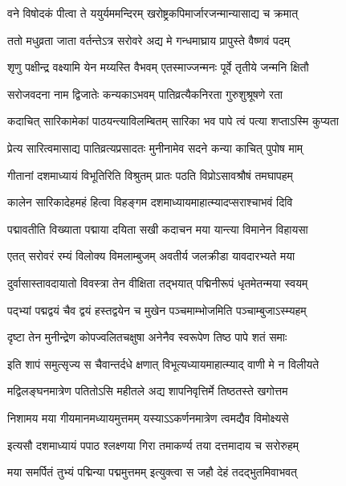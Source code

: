 \twolineshloka
{वने विषोदकं पीत्वा ते ययुर्यममन्दिरम्}
{खरोष्ट्रकपिमार्जारजन्मान्यासाद्य च क्रमात्} %

\twolineshloka
{ततो मधुव्रता जाता वर्तन्तेऽत्र सरोवरे}
{अद्य मे गन्धमाघ्राय प्रापुस्ते वैष्णवं पदम्} %

\twolineshloka
{शृणु पक्षीन्द्र वक्ष्यामि येन मय्यस्ति वैभवम्}
{एतस्माज्जन्मनः पूर्वे तृतीये जन्मनि क्षितौ} %

\twolineshloka
{सरोजवदना नाम द्विजातेः कन्यकाऽभवम्}
{पातिव्रत्यैकनिरता गुरुशुश्रूषणे रता} %

\twolineshloka
{कदाचित् सारिकामेकां पाठयन्त्याविलम्बितम्}
{सारिका भव पापे त्वं पत्या शप्ताऽस्मि कुप्यता} %

\twolineshloka
{प्रेत्य सारित्वमासाद्य पातिव्रत्यप्रसादतः}
{मुनीनामेव सदने कन्या काचित् पुपोष माम्} %

\twolineshloka
{गीतानां दशमाध्यायं विभूतिरिति विश्रुतम्}
{प्रातः पठति विप्रोऽसावश्रौषं तमघापहम्} %

\twolineshloka
{कालेन सारिकादेहमहं हित्वा विहङ्गम}
{दशमाध्यायमाहात्म्यादप्सराश्चाभवं दिवि} %

\twolineshloka
{पद्मावतीति विख्याता पद्माया दयिता सखी}
{कदाचन मया यान्त्या विमानेन विहायसा} %

\twolineshloka
{एतत् सरोवरं रम्यं विलोक्य विमलाम्बुजम्}
{अवतीर्य जलक्रीडा यावदारभ्यते मया} %

\twolineshloka
{दुर्वासास्तावदायातो विवस्त्रा तेन वीक्षिता}
{तद्भयात् पद्मिनीरूपं धृतमेतन्मया स्वयम्} %

\twolineshloka
{पद्भ्यां पद्मद्वयं चैव द्वयं हस्तद्वयेन च}
{मुखेन पञ्चमाम्भोजमिति पञ्चाम्बुजाऽस्म्यहम्} %

\twolineshloka
{दृष्टा तेन मुनीन्द्रेण कोपज्वलितचक्षुषा}
{अनेनैव स्वरूपेण तिष्ठ पापे शतं समाः} %

\twolineshloka
{इति शापं समुत्सृज्य स चैवान्तर्दधे क्षणात्}
{विभूत्यध्यायमाहात्म्याद् वाणी मे न विलीयते} %

\twolineshloka
{मद्विलङ्घनमात्रेण पतितोऽसि महीतले}
{अद्य शापनिवृत्तिर्मे तिष्ठतस्ते खगोत्तम} %

\twolineshloka
{निशामय मया गीयमानमध्यायमुत्तमम्}
{यस्याऽऽकर्णनमात्रेण त्वमद्यैव विमोक्ष्यसे} %

\twolineshloka
{इत्यसौ दशमाध्यायं पपाठ श्लक्ष्णया गिरा}
{तमाकर्ण्य तया दत्तमादाय च सरोरुहम्} %

\twolineshloka
{मया समर्पितं तुभ्यं पद्मिन्या पद्ममुत्तमम्}
{इत्युक्त्वा स जहौ देहं तदद्भुतमिवाभवत्} %

